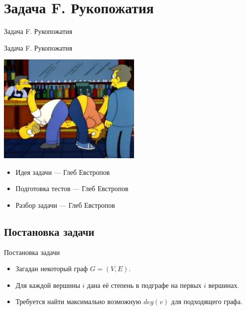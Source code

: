 \section{Задача F. Рукопожатия}

\begin{frame}[t]{Задача F. Рукопожатия}

  \begin{center}
    \LARGE Задача F. Рукопожатия
  \end{center}
  \begin{center}
	  \includegraphics[width=7cm]{pics/handshakes.jpg}
  \end{center}
\end{frame}

\begin{frame}[t]{}
  \vspace{3cm}
  \begin{itemize}
    \item Идея задачи --- Глеб Евстропов
    \item Подготовка тестов --- Глеб Евстропов
    \item Разбор задачи --- Глеб Евстропов
  \end{itemize}
\end{frame}

\subsection{Постановка задачи}

\begin{frame}[t]{Постановка задачи}
\begin{itemize}
    \item Загадан некоторый граф $G = (V, E)$.
    \item Для каждой вершины $i$ дана её степень в подграфе на первых $i$ вершинах.
    \item Требуется найти максимально возможную $deg(v)$ для подходящего графа.
\end{itemize}
\end{frame}

